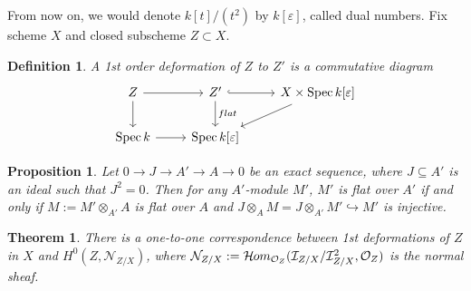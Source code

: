 \documentclass{ctexart}
\newtheorem{definition}{Definition}[section]
\newtheorem{theorem}{Theorem}[section]
\newtheorem{proposition}{Proposition}[section]
\newcommand{\sheafhom}{\mathcal{H}\kern -.5pt om}
\newcommand{\spec}{\operatorname{Spec}}
\begin{document}
From now on, we would denote $k[t]/(t^{2})$ by $k[\varepsilon]$, called dual numbers.
Fix scheme $X$ and closed subscheme $Z \subset X$.
\begin{definition}
    A 1st order deformation of $Z$ to $Z'$ is a commutative diagram
    \begin{equation}
        \begin{tikzcd}
            Z \arrow[r] \arrow[d] &
            Z' \arrow[r, hookrightarrow] \arrow[d, "flat"] &
            X \times \spec k[\varepsilon] \arrow[dl] \\
            \spec k \arrow[r] &
            \spec k[\varepsilon] &
        \end{tikzcd}
    \end{equation}
\end{definition}
\begin{proposition}
    Let $0 \rightarrow J \rightarrow A' \rightarrow A \rightarrow 0$ be an exact sequence,
    where $J \subseteq A'$ is an ideal such that $J^{2} = 0$.
    Then for any $A'$-module $M'$, $M'$ is flat over $A'$ if and only if $M := M' \otimes_{A'} A$ is flat over $A$ and $J \otimes_{A} M = J \otimes_{A'} M' \hookrightarrow M'$ is injective.
    \label{Proposition 1.1}
\end{proposition}
\begin{theorem}
    There is a one-to-one correspondence between 1st deformations of $Z$ in $X$ and $H^{0}(Z, \mathcal{N}_{Z/X})$,
    where $\mathcal{N}_{Z/X} := \sheafhom_{\mathcal{O}_{Z}}(\mathcal{I}_{Z/X}/\mathcal{I}_{Z/X}^{2}, \mathcal{O}_{Z})$ is the normal sheaf.
    \label{Theorem 1.1}
\end{theorem}
\end{document}
